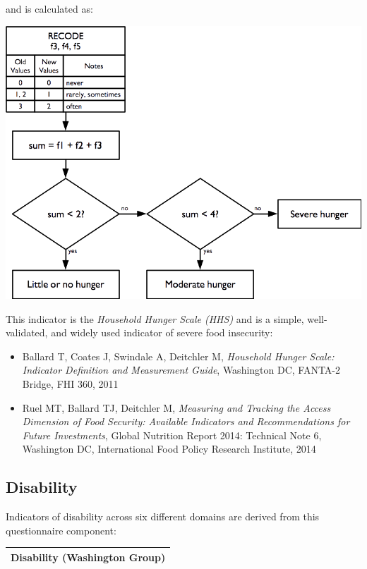 \documentclass[12pt,a4paper]{book}
\theoremstyle{definition}
\theoremstyle{definition}
\theoremstyle{definition}
\theoremstyle{remark}
\begin{document}
and is calculated as:

\begin{center}\includegraphics[width=800pt]{figures/indicators15} \end{center}

This indicator is the \emph{Household Hunger Scale (HHS)} and is a
simple, well-validated, and widely used indicator of severe food
insecurity:

\begin{itemize}
\item
  Ballard T, Coates J, Swindale A, Deitchler M, \emph{Household Hunger
  Scale: Indicator Definition and Measurement Guide}, Washington DC,
  FANTA-2 Bridge, FHI 360, 2011
\item
  Ruel MT, Ballard TJ, Deitchler M, \emph{Measuring and Tracking the
  Access Dimension of Food Security: Available Indicators and
  Recommendations for Future Investments}, Global Nutrition Report 2014:
  Technical Note 6, Washington DC, International Food Policy Research
  Institute, 2014
\end{itemize}

\hypertarget{disability}{%
\subsection{Disability}\label{disability}}

Indicators of disability across six different domains are derived from
this questionnaire component:

\begin{longtable}[]{@{}c@{}}
\toprule
\begin{minipage}[t]{0.97\columnwidth}\centering
\textbf{Disability (Washington Group)}\strut
\end{minipage}\tabularnewline
\bottomrule
\end{longtable}
\end{document}
